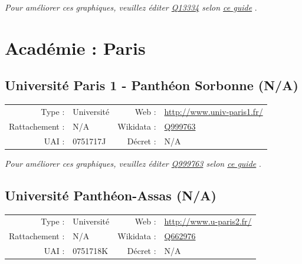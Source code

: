 \documentclass[12pt,french,landscape]{article}
\begin{document}
\textit{\scriptsize Pour améliorer ces graphiques, veuillez éditer \href{https://www.wikidata.org/entity/Q13334}{Q13334}  selon \href{https://github.com/cpesr/wikidataESR/blob/master/Rmd/wikidataESR.md}{ce guide}}
.


\newpage

\hypertarget{acaduxe9mie-paris}{%
\section{Académie : Paris}\label{acaduxe9mie-paris}}

\hypertarget{universituxe9-paris-1---panthuxe9on-sorbonne-na}{%
\subsection{Université Paris 1 - Panthéon Sorbonne
(N/A)}\label{universituxe9-paris-1---panthuxe9on-sorbonne-na}}

\begin{tabular*}{0.45\textwidth}{rp{2cm}rl}  
\hline  
Type : & Université & Web : &\href{http://www.univ-paris1.fr/}{http://www.univ-paris1.fr/} \\  
Rattachement : & N/A & Wikidata : & \href{https://www.wikidata.org/entity/Q999763}{Q999763} \\  
UAI : & 0751717J & Décret : & N/A \\  
\hline  
\end{tabular*}

\textit{\scriptsize Pour améliorer ces graphiques, veuillez éditer \href{https://www.wikidata.org/entity/Q999763}{Q999763}  selon \href{https://github.com/cpesr/wikidataESR/blob/master/Rmd/wikidataESR.md}{ce guide}}
.


\newpage

\hypertarget{universituxe9-panthuxe9on-assas-na}{%
\subsection{Université Panthéon-Assas
(N/A)}\label{universituxe9-panthuxe9on-assas-na}}

\begin{tabular*}{0.45\textwidth}{rp{2cm}rl}  
\hline  
Type : & Université & Web : &\href{http://www.u-paris2.fr/}{http://www.u-paris2.fr/} \\  
Rattachement : & N/A & Wikidata : & \href{https://www.wikidata.org/entity/Q662976}{Q662976} \\  
UAI : & 0751718K & Décret : & N/A \\  
\hline  
\end{tabular*}
\end{document}
